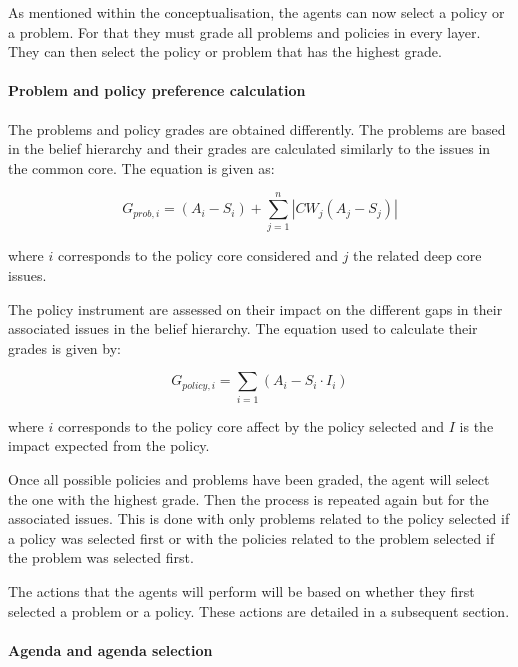 As mentioned within the conceptualisation, the agents can now select a policy or a problem. For that they must grade all problems and policies in every layer. They can then select the policy or problem that has the highest grade.

\paragraph{Problem and policy preference calculation}

The problems and policy grades are obtained differently. The problems are based in the belief hierarchy and their grades are calculated similarly to the issues in the common core. The equation is given as:

\begin{equation}
G_{prob, i} = \left( A_i - S_i \right) + \sum_{j=1}^n \left| CW_j \left( A_j - S_j \right) \right|
\end{equation}

where $i$ corresponds to the policy core considered and $j$ the related deep core issues.

The policy instrument are assessed on their impact on the different gaps in their associated issues in the belief hierarchy. The equation used to calculate their grades is given by:

\begin{equation}
G_{policy, i} = \sum_{i=1} \left( A_i - S_i \cdot I_i \right)
\end{equation}

where $i$ corresponds to the policy core affect by the policy selected and $I$ is the impact expected from the policy.

Once all possible policies and problems have been graded, the agent will select the one with the highest grade. Then the process is repeated again but for the associated issues. This is done with only problems related to the policy selected if a policy was selected first or with the policies related to the problem selected if the problem was selected first.

The actions that the agents will perform will be based on whether they first selected a problem or a policy. These actions are detailed in a subsequent section.

\paragraph{Agenda and agenda selection}

